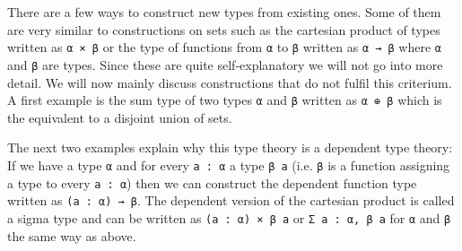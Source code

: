 There are a few ways to construct new types from existing ones. 
Some of them are very similar to constructions on sets such as the cartesian product of types written as \lstinline{α × β} or the type of functions from \lstinline{α} to \lstinline{β} written as \lstinline{α → β} where \lstinline{α} and \lstinline{β} are types.
Since these are quite self-explanatory we will not go into more detail.
We will now mainly discuss constructions that do not fulfil this criterium. 
A first example is the sum type of two types \lstinline{α} and \lstinline{β} written as \lstinline{α ⊕ β} which is the equivalent to a disjoint union of sets. 

The next two examples explain why this type theory is a dependent type theory:
If we have a type \lstinline{α} and for every \lstinline{a : α} a type \lstinline{β a} (i.e. \lstinline{β} is a function assigning a type to every \lstinline{a : α}) then we can construct the dependent function type written as \lstinline{(a : α) → β}. 
The dependent version of the cartesian product is called a sigma type and can be written as \lstinline{(a : α) × β a} or \lstinline{Σ a : α, β a} for \lstinline{α} and \lstinline{β} the same way as above.